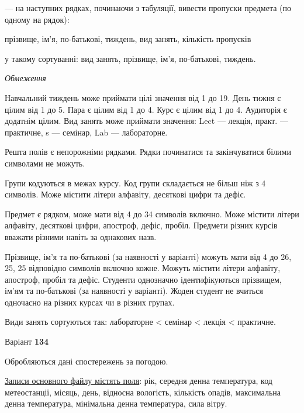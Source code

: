 \documentclass[11pt, ukrainian]{article}
\begin{document}
{\noindent}--- на наступних рядках, починаючи з табуляції, вивести пропуски предмета (по одному на рядок):\par
прізвище, ім’я, по-батькові, тиждень, вид занять, кількість пропусків

{\noindent}у такому сортуванні: вид занять, прізвище, ім’я, по-батькові, тиждень.


\bigskip\textit{Обмеження}

Навчальний тиждень може приймати цілі значення від 1 до 19.
День тижня є цілим від 1 до 5. Пара є цілим від 1 до 4.
Курс є цілим від 1 до 4. Аудиторія є додатнім цілим.
Вид занять може приймати значення:
Lect --- лекція, практ. --- практичне, s --- семінар, Lab --- лабораторне.

Решта полів є непорожніми рядками.
Рядки починатися та закінчуватися білими символами не можуть.

Групи кодуються в межах курсу.
Код групи складається не більш ніж з 4 символів.
Може містити літери алфавіту, десяткові цифри та дефіс.

Предмет є рядком, може мати від 4 до 34 символів включно.
Може містити літери алфавіту, десяткові цифри, апостроф, дефіс, пробіл.
Предмети різних курсів вважати різними навіть за однакових назв.

Прізвище, ім’я та по-батькові (за наявності у варіанті)
можуть мати від 4 до 26, 25, 25 відповідно символів включно кожне.
Можуть містити літери алфавіту, апостроф, пробіл та дефіс.
Студенти однозначно ідентифікуються прізвищем, ім’ям та по-батькові (за наявності у варіанті).
Жоден студент не вчиться одночасно на різних курсах чи в різних групах.

Види занять сортуються так: лабораторне < семінар < лекція < практичне.





\par
\newpage
{\center Варіант  \No \textbf { 134 }\par}
\bigskip
Обробляються дані спостережень за погодою. 

\underline{Записи основного файлу містять поля}: рік, середня денна температура, код метеостанції, місяць, день, відносна вологість, кількість опадів, максимальна денна температура, мінімальна денна температура, сила вітру.
\end{document}
